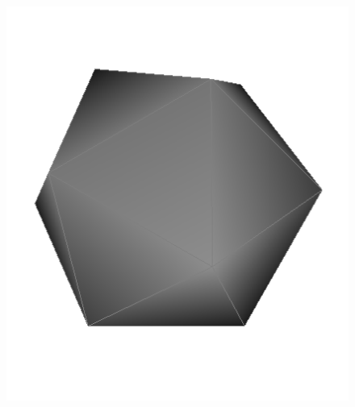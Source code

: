 \documentclass{beamer}
\begin{document}
\begin{frame}
\begin{figure}
        \includegraphics[scale=0.2]{img/icosahedron}
    \end{figure}
\end{frame}
\end{document}
